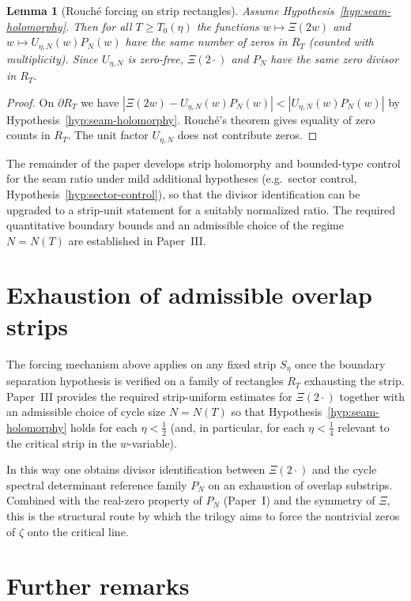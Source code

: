 \documentclass[11pt]{amsart}
\newtheorem{lemma}[theorem]{Lemma}
\theoremstyle{definition}
\theoremstyle{remark}
\begin{document}
\begin{lemma}[Rouch\'e forcing on strip rectangles]\label{lem:rouche-rectangle}
Assume Hypothesis~\ref{hyp:seam-holomorphy}.  Then for all $T\ge T_0(\eta)$ the functions $w\mapsto
\Xi(2w)$ and $w\mapsto U_{\eta,N}(w)P_N(w)$ have the same number of zeros in $R_T$ (counted with
multiplicity).  Since $U_{\eta,N}$ is zero-free, $\Xi(2\cdot)$ and $P_N$ have the same zero divisor in
$R_T$.
\end{lemma}

\begin{proof}
On $\partial R_T$ we have $|\Xi(2w)-U_{\eta,N}(w)P_N(w)|<|U_{\eta,N}(w)P_N(w)|$ by
Hypothesis~\ref{hyp:seam-holomorphy}.  Rouch\'e's theorem gives equality of zero counts in $R_T$.  The
unit factor $U_{\eta,N}$ does not contribute zeros.
\end{proof}

The remainder of the paper develops strip holomorphy and bounded-type control for the seam ratio
under mild additional hypotheses (e.g.\ sector control, Hypothesis~\ref{hyp:sector-control}), so that the
divisor identification can be upgraded to a strip-unit statement for a suitably normalized ratio.
The required quantitative boundary bounds and an admissible choice of the regime $N=N(T)$ are
established in Paper~III.


\section{Exhaustion of admissible overlap strips}\label{sec:exhaustion}
The forcing mechanism above applies on any fixed strip $S_\eta$ once the boundary separation
hypothesis is verified on a family of rectangles $R_T$ exhausting the strip.  Paper~III provides the
required strip-uniform estimates for $\Xi(2\cdot)$ together with an admissible choice of cycle size
$N=N(T)$ so that Hypothesis~\ref{hyp:seam-holomorphy} holds for each $\eta<\frac12$ (and, in
particular, for each $\eta<\frac14$ relevant to the critical strip in the $w$-variable).

In this way one obtains divisor identification between $\Xi(2\cdot)$ and the cycle spectral
determinant reference family $P_N$ on an exhaustion of overlap substrips.  Combined with the real-zero
property of $P_N$ (Paper~I) and the symmetry of $\Xi$, this is the structural route by which the
trilogy aims to force the nontrivial zeros of $\zeta$ onto the critical line.


\section{Further remarks}
\end{document}
